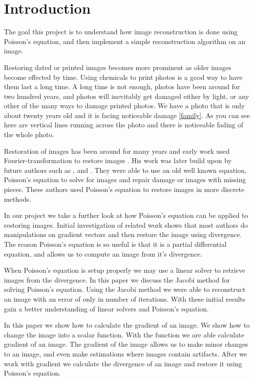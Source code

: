 \documentclass[10pt,twopage]{acmsiggraph}
\begin{document}
\section{Introduction}
\label{Intro}

The goal this project is to understand how image reconstruction is done using Poisson's equation, and then implement a simple reconstruction algorithm on an image.

Restoring dated or printed images becomes more prominent as older images become effected by time. Using chemicals to print photos is a good way to have them last a long time. A long time is not enough, photos have been around for two hundred years, and photos will inevitably get damaged either by light, or any other of the many ways to damage printed photos. We have a photo that is only about twenty years old and it is facing noticeable damage \ref{family}. As you can see here are vertical lines running across the photo and there is noticeable fading of the whole photo. 

Restoration of images has been around for many years and early work used Fourier-transformation to restore images \cite{richardson72}. His work was later build upon by future authors such as \cite{Bertalmio}, and \cite{Perez}. They were able to use an old well known equation, Poisson's equation to solve for images and repair damage or images with missing pieces. These authors used Poisson's equation to restore images in more discrete methods.

In our project we take a further look at how Poisson's equation can be applied to restoring images. Initial investigation of related work shows that most authors do manipulations on gradient vectors and then restore the image using  divergence.  The reason Poisson's equation is so useful is that it is a partial differential equation, and allows us to compute an image from it's divergence. 

When Poisson's equation is setup properly we may use a linear solver to retrieve images from the divergence. In this paper we discuss the Jacobi method for solving Poisson's equation. Using the Jacobi method we were able to reconstruct an image with an error of only \result in \iteration number of iterations. With these initial results gain a better understanding of linear solvers and Poisson's equation.

In this paper we show how to calculate the gradient of an image. We show how to change the image into a scalar function. With the function we are able calculate gradient of an image. The gradient of the image allows us to make minor changes to an image, and even make estimations where images contain artifacts. After we work with gradient we calculate the divergence of an image and restore it using Poisson's equation. 
\end{document}
